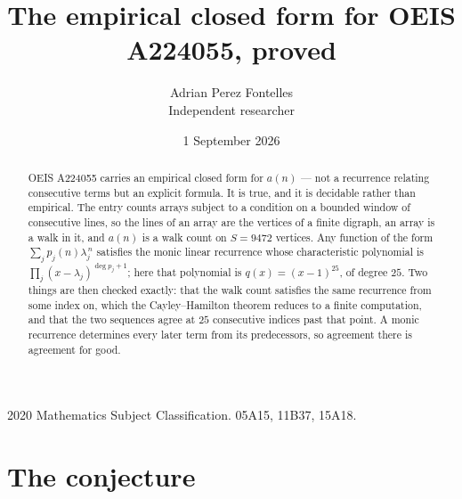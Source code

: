 \documentclass[11pt,a4paper]{article}
\title{The empirical closed form for OEIS A224055, proved}
\author{Adrian Perez Fontelles\\ \small Independent researcher}
\date{1 September 2026}
\theoremstyle{plain}
\theoremstyle{definition}
\begin{document}
\maketitle

\begin{abstract}
OEIS A224055 carries an empirical closed form for $a(n)$ --- not a recurrence relating
consecutive terms but an explicit formula. It is true, and it is decidable rather than
empirical. The entry counts arrays subject to a condition on a bounded window of consecutive lines, so the lines of an array are the
vertices of a finite digraph, an array is a walk in it, and $a(n)$ is a walk count on
$S=9472$ vertices. Any function of the form $\sum_j p_j(n)\lambda_j^{\,n}$ satisfies the
monic linear recurrence whose characteristic polynomial is
$\prod_j(x-\lambda_j)^{\deg p_j+1}$; here that polynomial is $q(x)=(x-1)^{25}$, of degree
$25$. Two things are then checked exactly: that the walk count satisfies the same
recurrence from some index on, which the Cayley--Hamilton theorem reduces to a finite
computation, and that the two sequences agree at $25$ consecutive indices past that
point. A monic recurrence determines every later term from its predecessors, so agreement
there is agreement for good.
\end{abstract}

\noindent\small 2020 Mathematics Subject Classification. 05A15, 11B37, 15A18.\normalsize

\section{The conjecture}
\end{document}
